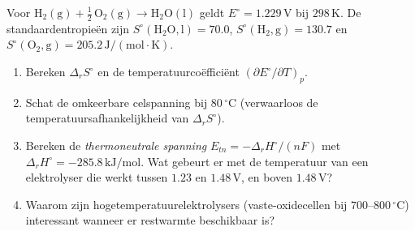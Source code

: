 \begin{oefening}\label{oef:h7-11}
Voor \(\mathrm{H_2(g) + \tfrac{1}{2}\,O_2(g) \rightarrow H_2O(l)}\) geldt \(E^\circ = 1.229\,\mathrm{V}\) bij \(298\,\mathrm{K}\). De standaardentropieën zijn \(S^\circ(\mathrm{H_2O,l}) = 70.0\), \(S^\circ(\mathrm{H_2,g}) = 130.7\) en \(S^\circ(\mathrm{O_2,g}) = 205.2\,\mathrm{J/(mol\cdot K)}\).

\begin{enumerate}
\item[(a)]
  Bereken \(\Delta_r S^\circ\) en de temperatuurcoëfficiënt \((\partial E^\circ/\partial T)_p\).
\item[(b)]
  Schat de omkeerbare celspanning bij \(80\,^\circ\mathrm{C}\) (verwaarloos de temperatuursafhankelijkheid van \(\Delta_r S^\circ\)).
\item[(c)]
  Bereken de \emph{thermoneutrale spanning} \(E_{tn} = -\Delta_r H^\circ/(nF)\) met \(\Delta_r H^\circ = -285.8\,\mathrm{kJ/mol}\). Wat gebeurt er met de temperatuur van een elektrolyser die werkt tussen \(1.23\) en \(1.48\,\mathrm{V}\), en boven \(1.48\,\mathrm{V}\)?
\item[(d)]
  Waarom zijn hogetemperatuurelektrolysers (vaste-oxidecellen bij \(700\)--\(800\,^\circ\mathrm{C}\)) interessant wanneer er restwarmte beschikbaar is?
\end{enumerate}
\end{oefening}
